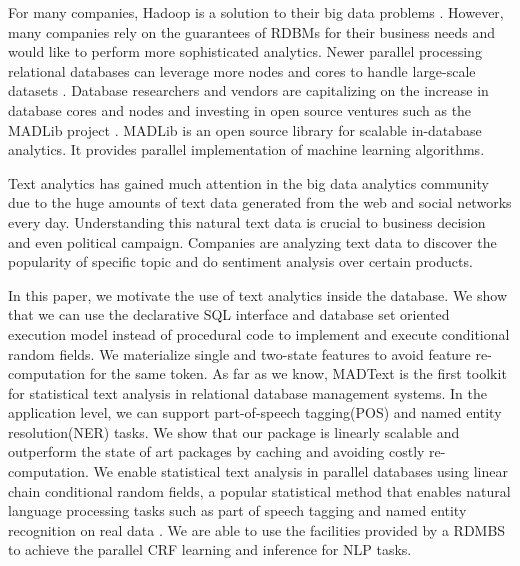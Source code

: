\documentclass[11pt,letterpaper]{article}
\begin{document}
For many companies, Hadoop is a solution to their big data problems \cite{DBLP:journals/corr/abs-1209-2191}. 
However, many companies rely on the guarantees of RDBMs for their business needs and would like to 
perform more sophisticated analytics.
Newer parallel processing relational databases can leverage more nodes and cores to handle large-scale datasets
 \cite{DeWitt:1992:PDS:129888.129894,Stonebraker:2012:NON:2366316.2366319}. 
Database researchers and vendors are capitalizing on the increase in database cores and nodes
and investing in open source ventures such as the MADLib project \cite {Cohen:2009:MSN:1687553.1687576,Hellerstein:2012:MAL:2367502.2367510}. 
MADLib is an open source library for scalable in-database analytics.
It provides parallel implementation of machine learning algorithms.

Text analytics has gained much attention in the big data analytics community due to the huge amounts of text data generated from the web and 
social networks every day.
Understanding this natural text data is crucial to business decision and even political campaign. 
Companies are analyzing text data to discover the popularity of specific topic and do sentiment analysis over certain products.

In this paper, we motivate the use of text analytics inside the database.
We show that we can use the declarative SQL interface and database set oriented execution model instead of procedural code to 
implement and execute 
conditional random fields. 
We materialize  single and two-state features to avoid feature re-computation for the same token.  
As far as we know, MADText is the first toolkit for statistical text analysis in relational database management systems.  
In the application level, we can support part-of-speech tagging(POS) and  named entity resolution(NER) tasks.  
We show that our package is linearly scalable and outperform the state of art packages by caching and avoiding costly re-computation.
We enable statistical text analysis in parallel databases using linear chain conditional random fields, a
popular statistical method that enables
natural language processing tasks such as part of speech tagging and named entity recognition on
real data \cite{DBLP:conf/icml/LaffertyMP01}.
We are able to use the facilities provided by a RDMBS to achieve the parallel CRF learning and inference for NLP tasks.
\end{document}
